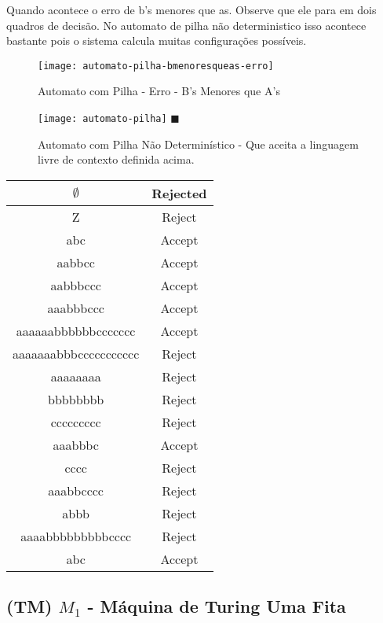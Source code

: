 \documentclass[12pt, a4paper]{article}
\begin{document}
\qquad Quando acontece o erro de b's menores que as. Observe que ele para em dois quadros de decisão. No automato de pilha não deterministico isso acontece bastante pois o sistema calcula muitas configurações possíveis.

\begin{figure}[ht]
  \centering
  \texttt{[image: automato-pilha-bmenoresqueas-erro]}
  \caption{Automato com Pilha - Erro - B's Menores que A's}
\end{figure}


\begin{figure}[ht]
  \centering
  \texttt{[image: automato-pilha]} \flushright $\blacksquare$
  \caption{Automato com Pilha Não Determinístico - Que aceita a linguagem livre de contexto definida acima.}
\end{figure}

\begin{tabular}{|c|c|}
  \hline $\emptyset$           & Rejected \\
  \hline Z	                    & Reject \\
  \hline abc	                & Accept \\
  \hline aabbcc	            & Accept \\
  \hline aabbbccc	            & Accept \\
  \hline aaabbbccc	            & Accept \\
  \hline aaaaaabbbbbbccccccc	 & Accept \\
  \hline aaaaaaabbbccccccccccc & Reject \\
  \hline aaaaaaaa	            & Reject \\
  \hline bbbbbbbb	            & Reject \\
  \hline ccccccccc	            & Reject \\
  \hline aaabbbc	            & Accept \\
  \hline cccc	                & Reject \\
  \hline aaabbcccc	            & Reject \\
  \hline abbb	                & Reject \\
  \hline aaaabbbbbbbbbcccc	     & Reject \\
  \hline abc	                & Accept \\
  \hline
\end{tabular}

\pagebreak
\subsection{(TM) $M_1$ - Máquina de Turing Uma Fita}
\end{document}
